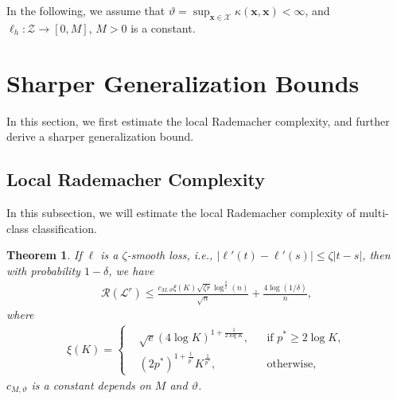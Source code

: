 \documentclass{article}
\newtheorem{theorem}{Theorem}
\begin{document}
In the following, we assume that
$\vartheta=\sup_{\mathbf x\in \mathcal{X}}\kappa(\mathbf x,\mathbf x)< \infty$,
and $\ell_h:\mathcal{Z}\rightarrow [0,M]$,
$M>0$ is a constant.
\section{Sharper Generalization Bounds}
In this section, we first estimate the local Rademacher complexity,
and further derive a sharper generalization bound.

\subsection{Local Rademacher Complexity}
In this subsection, we will estimate the local Rademacher complexity of multi-class classification.
\begin{theorem}
\label{rademacherlocal}
  If $\ell$ is a $\zeta$-smooth loss, i.e., $|\ell'(t)-\ell'(s)|\leq \zeta|t-s|$,
  then with probability $1-\delta$,
  we have
  \begin{align*}
    \mathcal{R}(\mathcal{L}^r) \leq \frac{c_{M,\vartheta}\xi(K)\sqrt{\zeta r}\log^{\frac{3}{2}}(n)}{\sqrt{n}}+\frac{4\log(1/\delta)}{n},
  \end{align*}
  where
  \begin{align*}
  \xi(K)=
  \left\{
      \begin{aligned}
      &\sqrt{e}(4\log K)^{1+\frac{1}{2\log K}}, &&\text{if } p^\ast\geq 2\log K,\\
      &(2p^\ast)^{1+\frac{1}{p^\ast}}K^{\frac{1}{p^\ast}}, &&\text{otherwise},
      \end{aligned}
      \right.
  \end{align*}
  $c_{M,\vartheta}$ is a constant depends on $M$ and $\vartheta$.
\end{theorem}
\end{document}
